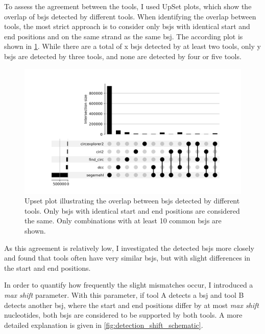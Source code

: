 To assess the agreement between the tools, I used UpSet plots, which show the
overlap of \gls{bsj}s detected by different tools.
When identifying the overlap between tools, the most strict approach is to
consider only \gls{bsj}s with identical start and end positions and on the same
strand as the same \gls{bsj}.
The according plot is shown in \cref{fig:detection_upset_0}.
While there are a total of x \gls{bsj}s detected by at least two tools, only y
\gls{bsj}s are detected by three tools, and none are detected by four or five
tools.

\begin{figure}[ht]
    \centering

    \includegraphics[width=\textwidth]{chapters/4_results_and_discussion/figures/detection/upset/shift_0.png}
    \caption{Upset plot illustrating the overlap between \gls{bsj}s detected by
        different tools.
        Only \gls{bsj}s with identical start and end positions are considered the same.
        Only combinations with at least 10 common \gls{bsj}s are shown.
    }
    \label{fig:detection_upset_0}
\end{figure}

As this agreement is relatively low, I investigated the detected \gls{bsj}s
more closely and found that tools often have very similar \gls{bsj}s, but with
slight differences in the start and end positions.

In order to quantify how frequently the slight mismatches occur, I introduced a
\textit{max shift} parameter.
With this parameter, if tool A detects a \gls{bsj} and tool B detects another
\gls{bsj}, where the start and end positions differ by at most \textit{max
    shift} nucleotides, both \gls{bsj}s are considered to be supported by both
tools.
A more detailed explanation is given in \cref{fig:detection_shift_schematic}.

